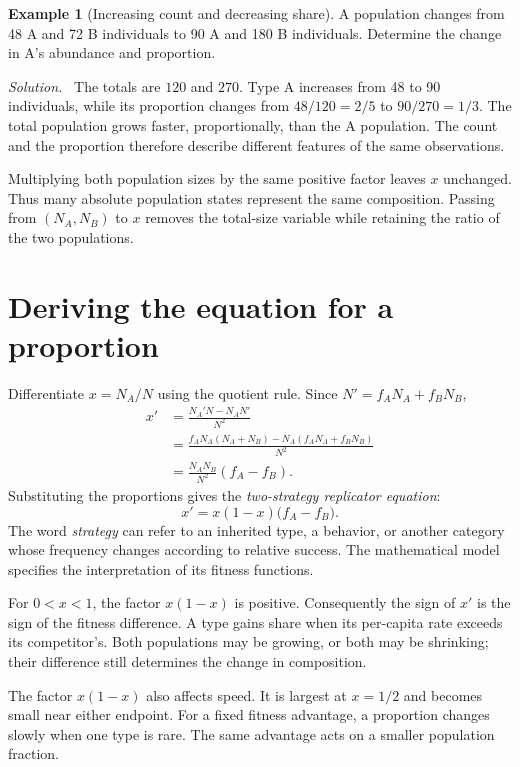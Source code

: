 \documentclass[11pt,oneside,openany]{book}
\theoremstyle{definition}
\newtheorem{example}{Example}[chapter]
\theoremstyle{remark}
\newenvironment{solution}{\par\smallskip\noindent\textit{Solution.}\ }{\par\smallskip}
\numberwithin{equation}{chapter}
\begin{document}
\begin{example}[Increasing count and decreasing share]
A population changes from 48 A and 72 B individuals to 90 A and 180 B individuals. Determine the change in A's abundance and proportion.
\begin{solution}
The totals are $120$ and $270$. Type A increases from 48 to 90 individuals, while its proportion changes from $48/120=2/5$ to $90/270=1/3$. The total population grows faster, proportionally, than the A population. The count and the proportion therefore describe different features of the same observations.
\end{solution}
\end{example}

Multiplying both population sizes by the same positive factor leaves $x$ unchanged. Thus many absolute population states represent the same composition. Passing from $(N_A,N_B)$ to $x$ removes the total-size variable while retaining the ratio of the two populations.

\section{Deriving the equation for a proportion}
Differentiate $x=N_A/N$ using the quotient rule. Since $N'=f_A N_A+f_B N_B$,
\begin{align*}
x'&=\frac{N_A'N-N_A N'}{N^2}\\
&=\frac{f_A N_A(N_A+N_B)-N_A(f_A N_A+f_B N_B)}{N^2}\\
&=\frac{N_A N_B}{N^2}(f_A-f_B).
\end{align*}
Substituting the proportions gives the \emph{two-strategy replicator equation}:
\begin{equation}\label{eq:binaryrep}
\boxed{x'=x(1-x)\bigl(f_A-f_B\bigr).}
\end{equation}
The word \emph{strategy} can refer to an inherited type, a behavior, or another category whose frequency changes according to relative success. The mathematical model specifies the interpretation of its fitness functions.

For $0<x<1$, the factor $x(1-x)$ is positive. Consequently the sign of $x'$ is the sign of the fitness difference. A type gains share when its per-capita rate exceeds its competitor's. Both populations may be growing, or both may be shrinking; their difference still determines the change in composition.

The factor $x(1-x)$ also affects speed. It is largest at $x=1/2$ and becomes small near either endpoint. For a fixed fitness advantage, a proportion changes slowly when one type is rare. The same advantage acts on a smaller population fraction.
\end{document}
